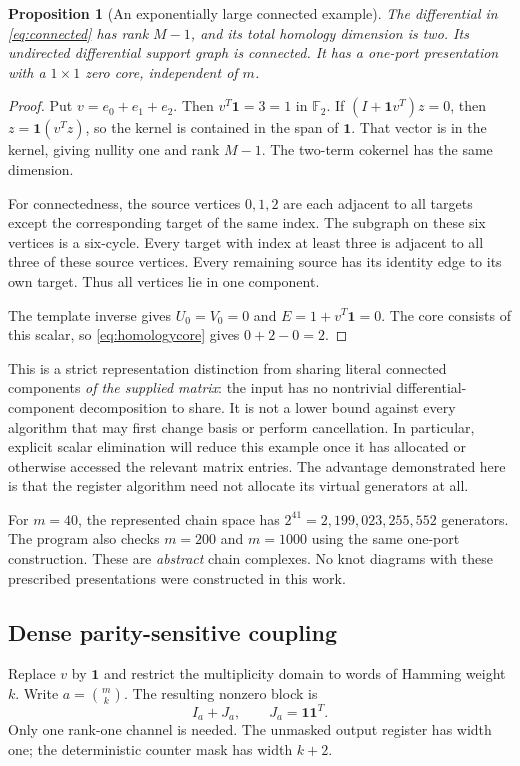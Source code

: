 \documentclass[11pt,letterpaper]{article}
\newcommand{\F}{{\mathbb F_2}}
\newcommand{\one}{\mathbf 1}
\newtheorem{proposition}[theorem]{Proposition}
\theoremstyle{definition}
\theoremstyle{remark}
\numberwithin{equation}{section}
\begin{document}
\begin{proposition}[An exponentially large connected example]
\label{prop:connected}
The differential in \eqref{eq:connected} has rank $M-1$, and its total
homology dimension is two. Its undirected differential support graph is
connected. It has a one-port presentation with a $1\times1$ zero core,
independent of $m$.
\end{proposition}
\begin{proof}
Put $v=e_0+e_1+e_2$. Then $v^T\one=3=1$ in $\F$.
If $(I+\one v^T)z=0$, then $z=\one(v^Tz)$, so the kernel is contained
in the span of $\one$. That vector is in the kernel, giving nullity one
and rank $M-1$. The two-term cokernel has the same dimension.

For connectedness, the source vertices $0,1,2$ are each adjacent to all
targets except the corresponding target of the same index. The subgraph
on these six vertices is a six-cycle. Every target with index at least
three is adjacent to all three of these source vertices. Every remaining
source has its identity edge to its own target. Thus all vertices lie
in one component.

The template inverse gives $U_0=V_0=0$ and
$E=1+v^T\one=0$. The core consists of this scalar, so
\eqref{eq:homologycore} gives $0+2-0=2$.
\end{proof}

This is a strict representation distinction from sharing literal
connected components \emph{of the supplied matrix}: the input has no
nontrivial differential-component decomposition to share. It is not a
lower bound against every algorithm that may first change basis or
perform cancellation. In particular, explicit scalar elimination will
reduce this example once it has allocated or otherwise accessed the
relevant matrix entries. The advantage demonstrated here is that the
register algorithm need not allocate its virtual generators at all.

For $m=40$, the represented chain space has
$2^{41}=2,199,023,255,552$ generators. The program also checks $m=200$ and
$m=1000$ using the same one-port construction. These are \emph{abstract}
chain complexes. No knot diagrams with these prescribed presentations
were constructed in this work.

\subsection{Dense parity-sensitive coupling}
Replace $v$ by $\one$ and restrict the multiplicity domain to words of
Hamming weight $k$. Write $a=\binom mk$. The resulting nonzero block is
\begin{equation}
 I_a+J_a,\qquad J_a=\one\one^T.
 \label{eq:binomial}
\end{equation}
Only one rank-one channel is needed. The unmasked output register has
width one; the deterministic counter mask has width $k+2$.
\end{document}
